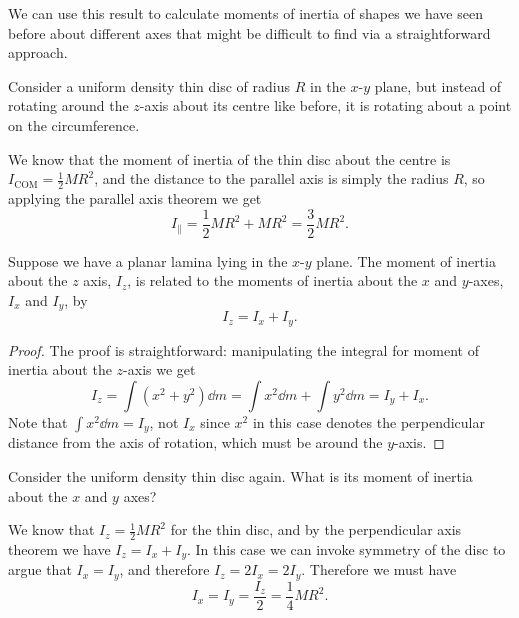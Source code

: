\documentclass[../classical_mechanics.tex]{subfiles}
\begin{document}
        We can use this result to calculate moments of inertia of shapes we have seen before about different axes that might be difficult to find via a straightforward approach.
        \begin{example}
            Consider a uniform density thin disc of radius $R$ in the $x$-$y$ plane, but instead of rotating around the $z$-axis about its centre like before, it is rotating about a point on the circumference.
            
            We know that the moment of inertia of the thin disc about the centre is $I_\text{COM}=\frac{1}{2}MR^2$, and the distance to the parallel axis is simply the radius $R$, so applying the parallel axis theorem we get
            \begin{equation}
                I_\parallel=\frac{1}{2}MR^2+MR^2=\frac{3}{2}MR^2.
            \end{equation}
        \end{example}
        \begin{theorem}
            Suppose we have a planar lamina lying in the $x$-$y$ plane.
            The moment of inertia about the $z$ axis, $I_z$, is related to the moments of inertia about the $x$ and $y$-axes, $I_x$ and $I_y$, by
            \begin{equation}
                I_z=I_x+I_y.
            \end{equation}
        \end{theorem}
        \begin{proof}
            The proof is straightforward: manipulating the integral for moment of inertia about the $z$-axis we get
            \begin{equation}
                I_z=\int(x^2+y^2)\dd{m}=\int x^2\dd{m}+\int y^2\dd{m}=I_y+I_x.
            \end{equation}
            Note that $\int x^2\dd{m}=I_y$, not $I_x$ since $x^2$ in this case denotes the perpendicular distance from the axis of rotation, which must be around the $y$-axis.
        \end{proof}
        \begin{example}
            Consider the uniform density thin disc again.
            What is its moment of inertia about the $x$ and $y$ axes?

            We know that $I_z=\frac{1}{2}MR^2$ for the thin disc, and by the perpendicular axis theorem we have $I_z=I_x+I_y$.
            In this case we can invoke symmetry of the disc to argue that $I_x=I_y$, and therefore $I_z=2I_x=2I_y$.
            Therefore we must have
            \begin{equation}
                I_x=I_y=\frac{I_z}{2}=\frac{1}{4}MR^2.
            \end{equation}
        \end{example}
\end{document}
